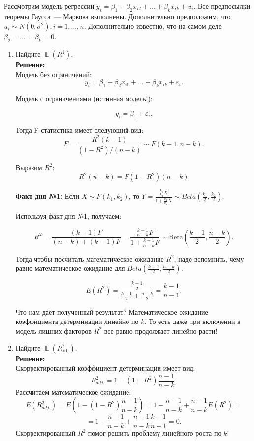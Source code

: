 \documentclass[12pt]{article}
\DeclareMathOperator{\E}{\mathbb{E}}
\newcommand{\dBeta}{\mathrm{Beta}}
\renewcommand{\u}{u}
\newcommand{\adj}{\text{adj}}
\begin{document}
\begin{problem}
Рассмотрим модель регрессии $y_i = \beta_1 + \beta_2x_{i2} + \dots +\beta_kx_{ik} + \u_i$. 
Все предпосылки теоремы Гаусса~— Маркова выполнены. 
Дополнительно предположим, что $\u_i \sim N(0,\sigma^2), i=1, \dots, n$. 
Дополнительно известно, что на самом деле $\beta_2 = \dots = \beta_k = 0$.
\begin{enumerate}
\item Найдите $\E(R^2)$.\\

\textbf{Решение:}\\
Модель без ограничений: 
\[
y_i = \beta_1 + \beta_2x_{i1} + \dots +\beta_kx_{ik} + \varepsilon_i.
\]

Модель с ограничениями (истинная модель!):

\[
y_i = \beta_1 + \varepsilon_i.
\]

Тогда F-статистика имеет следующий вид:
\[
F = \frac{R^2(k-1)}{(1-R^2)/(n-k)} \sim F(k-1,n-k).
\]

Выразим $R^2$:
\[
R^2(n-k) = F(1-R^2)(n-k)
\]

\textbf{Факт дня №1:} Если $X \sim F(k_1,k_2)$, то $Y = \frac{\frac{k_1}{k_2}X}{1+\frac{k_1}{k_2}X} \sim Beta \left(\frac{k_1}{2}, \frac{k_2}{2}\right)$.

Используя факт дня №1, получаем:

\[
R^2 = \frac{(k-1)F}{(n-k) + (k-1)F} = \frac{\frac{k-1}{n-k}F}{1+\frac{k-1}{n-k}F} \sim \dBeta\left(\frac{k-1}{2},\frac{n-k}{2}\right).
\]

Тогда чтобы посчитать математическое ожидание $R^2$, надо вспомнить, чему равно математическое ожидание для $Beta\left(\frac{k-1}{2},\frac{n-k}{2}\right)$:

\[
E(R^2) = \frac{\frac{k-1}{2}}{\frac{k-1}{2}+\frac{n-k}{2}} = \frac{k-1}{n-1}.
\]

Что нам даёт полученный результат? Математическое ожидание коэффициента детерминации линейно по $k$. То есть даже при включении в модель лишних факторов $R^2$ все равно продолжает линейно расти!
\item Найдите $\E(R^2_{\adj})$.\\
\textbf{Решение:}\\
Скорректированный коэффициент детерминации имеет вид:
\[
R^2_{adj.} = 1 - \left(1 - R^2\right)\frac{n-1}{n-k}.
\]
Рассчитаем математическое ожидание:
\[
E(R^2_{adj.}) = E\left(1 - \left(1 - R^2\right)\frac{n-1}{n-k}\right) = 1-\frac{n-1}{n-k}+\frac{n-1}{n-k}E(R^2) = 
\]
\[
= 1-\frac{n-1}{n-k}+\frac{n-1}{n-k}\frac{k-1}{n-1} = 0.
\]
Скорректированный $R^2$ помог решить проблему линейного роста по $k$!
\end{enumerate}
\end{problem}
\end{document}
